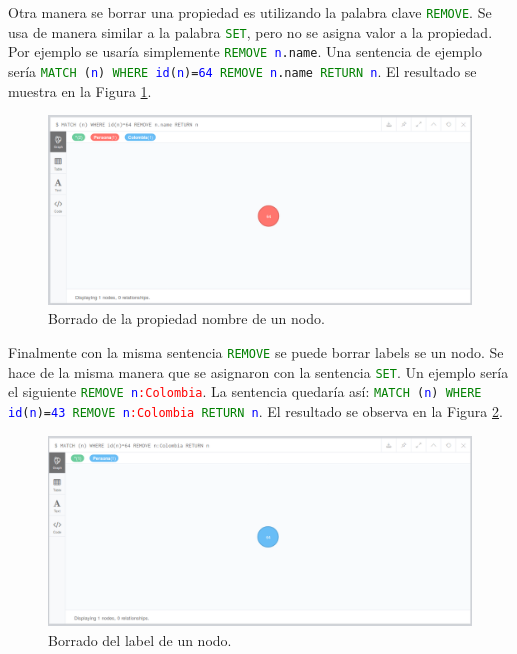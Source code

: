 \documentclass[conference]{IEEEtran}
\begin{document}
Otra manera se borrar una propiedad es utilizando la palabra clave \texttt{\textcolor{green}{REMOVE}}. Se usa de manera similar a la palabra \texttt{\textcolor{green}{SET}}, pero no se asigna valor a la propiedad. Por ejemplo se usaría simplemente \texttt{\textcolor{green}{REMOVE} \textcolor{blue}{n}.name}. Una sentencia de ejemplo sería \texttt{\textcolor{green}{MATCH} (\textcolor{blue}{n}) \textcolor{green}{WHERE} \textcolor{blue}{id}(\textcolor{blue}{n})=\textcolor{blue}{64} \textcolor{green}{REMOVE} \textcolor{blue}{n}.name  \textcolor{green}{RETURN} \textcolor{blue}{n}}. El resultado se muestra en la Figura \ref{fig31}.

\begin{figure}[H]
\begin{center}
\includegraphics[width= 0.45 \textwidth]{remove_nombre1.png}
\end{center}
\caption{Borrado de la propiedad nombre de un nodo.}
\label{fig31}
\end{figure}

Finalmente con la misma sentencia \texttt{\textcolor{green}{REMOVE}} se puede borrar labels se un nodo. Se hace de la misma manera que se asignaron con la sentencia \texttt{\textcolor{green}{SET}}. Un ejemplo sería el siguiente \texttt{\textcolor{green}{REMOVE} \textcolor{blue}{n}\textcolor{red}{:Colombia}}. La sentencia quedaría así: \texttt{\textcolor{green}{MATCH} (\textcolor{blue}{n}) \textcolor{green}{WHERE} \textcolor{blue}{id}(\textcolor{blue}{n})=\textcolor{blue}{43} \textcolor{green}{REMOVE} \textcolor{blue}{n}\textcolor{red}{:Colombia} \textcolor{green}{RETURN} \textcolor{blue}{n}}. El resultado se observa en la Figura \ref{fig32}.

\begin{figure}[H]
\begin{center}
\includegraphics[width= 0.45 \textwidth]{remove_label1.png}
\end{center}
\caption{Borrado del label de un nodo.}
\label{fig32}
\end{figure}
\end{document}
